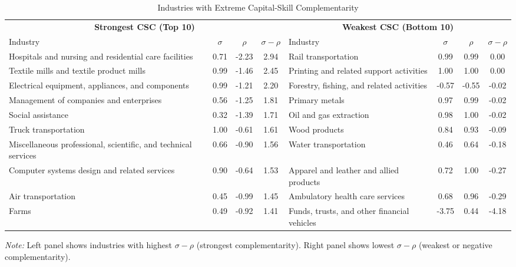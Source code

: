 \begin{table}[H]
\caption{Industries with Extreme Capital-Skill Complementarity}
\label{tab:extreme_csc}
\begin{center}
\small
\begin{tabular}{lccc|lccc}
\toprule
\multicolumn{4}{c}{\textbf{Strongest CSC (Top 10)}} & \multicolumn{4}{c}{\textbf{Weakest CSC (Bottom 10)}} \\
\cmidrule(lr){1-4} \cmidrule(lr){5-8}
Industry & $\sigma$ & $\rho$ & $\sigma-\rho$ & Industry & $\sigma$ & $\rho$ & $\sigma-\rho$ \\
\midrule
Hospitals and nursing and residential care facilities & 0.71 & -2.23 & 2.94 & Rail transportation & 0.99 & 0.99 & 0.00 \\
Textile mills and textile product mills & 0.99 & -1.46 & 2.45 & Printing and related support activities & 1.00 & 1.00 & 0.00 \\
Electrical equipment, appliances, and components & 0.99 & -1.21 & 2.20 & Forestry, fishing, and related activities & -0.57 & -0.55 & -0.02 \\
Management of companies and enterprises & 0.56 & -1.25 & 1.81 & Primary metals & 0.97 & 0.99 & -0.02 \\
Social assistance & 0.32 & -1.39 & 1.71 & Oil and gas extraction & 0.98 & 1.00 & -0.02 \\
Truck transportation & 1.00 & -0.61 & 1.61 & Wood products & 0.84 & 0.93 & -0.09 \\
Miscellaneous professional, scientific, and technical services & 0.66 & -0.90 & 1.56 & Water transportation & 0.46 & 0.64 & -0.18 \\
Computer systems design and related services & 0.90 & -0.64 & 1.53 & Apparel and leather and allied products & 0.72 & 1.00 & -0.27 \\
Air transportation & 0.45 & -0.99 & 1.45 & Ambulatory health care services & 0.68 & 0.96 & -0.29 \\
Farms & 0.49 & -0.92 & 1.41 & Funds, trusts, and other financial vehicles & -3.75 & 0.44 & -4.18 \\
\bottomrule
\end{tabular}
\end{center}
\begin{minipage}{\textwidth}
\small
\textit{Note:} Left panel shows industries with highest $\sigma - \rho$ (strongest complementarity). Right panel shows lowest $\sigma - \rho$ (weakest or negative complementarity).
\end{minipage}
\end{table}

